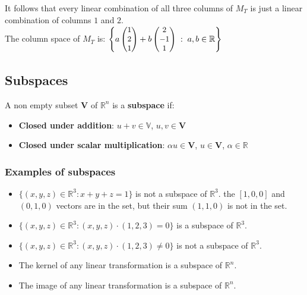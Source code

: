 \documentclass[a4paper, 9pt]{extarticle}
\begin{document}
It follows that every linear combination of all three columns of $M_T$ is just a linear combination of columns $1$ and $2$. \\
The column space of $M_T$ is:
$
  \small
  \left\{
  a\begin{pmatrix}
    1 \\
    2 \\
    1
  \end{pmatrix}
  +
  b \begin{pmatrix}
    2  \\
    -1 \\
    1
  \end{pmatrix} \; : \; a,b \in \mathbb{R}
  \right\}
$
\subsection{Subspaces}
\begin{definitionbox}{}{}
  A non empty subset $\textbf{V}$ of $\mathbb{R}^n$ is a \textbf{subspace} if:
  \begin{itemize}
    \item \textbf{Closed under addition}: $u +v \in \mathbb{V}$, $u, v \in \textbf{V}$
    \item \textbf{Closed under scalar multiplication}: $\alpha u \in \textbf{V}$, $u \in \textbf{V}$, $\alpha \in \mathbb{R}$
  \end{itemize}
\end{definitionbox}
\subsubsection*{Examples of subspaces}
\begin{itemize}
  \item $\{(x,y,z) \in \mathbb{R}^3 : x + y + z = 1\}$ is not a subspace of $\mathbb{R}^3$. the $[1,0,0]$ and $(0,1,0)$ vectors are in the set, but their sum $(1,1,0)$ is not in the set.
  \item $\{(x,y,z) \in \mathbb{R}^3 : (x,y,z) \cdot (1,2,3) = 0\}$ is a subspace of $\mathbb{R}^3$.
  \item $\{(x,y,z) \in \mathbb{R}^3 : (x,y,z) \cdot (1,2,3) \neq 0\}$ is not a subspace of $\mathbb{R}^3$.
  \item The kernel of any linear transformation is a subspace of $\mathbb{R}^n$.
  \item The image of any linear transformation is a subspace of $\mathbb{R}^n$.
\end{itemize}
\end{document}
